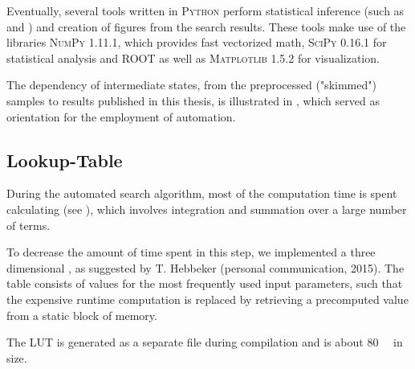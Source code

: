 Eventually, several tools written in \textsc{Python} perform statistical inference (such as \ptilde and \phat) and creation of figures from the search results. These tools make use of the libraries \textsc{NumPy} 1.11.1\cite{Walt:NumPyarraystructure}, which provides fast vectorized math, \textsc{SciPy} 0.16.1\cite{Jones:SciPyOpensource} for statistical analysis and \textsc{ROOT} as well as \textsc{Matplotlib} 1.5.2\cite{Hunter:Matplotlib2Dgraphics} for visualization.

The dependency of intermediate states, from the preprocessed ("skimmed") samples to results published in this thesis, is illustrated in , which served as orientation for the employment of automation.

\subsection{Lookup-Table}
During the automated search algorithm, most of the computation time is spent calculating \TS (see ), which involves integration and summation over a large number of terms.

To decrease the amount of time spent in this step, we implemented a three dimensional , as suggested by T. Hebbeker (personal communication, 2015). The table consists of \TS values for the most frequently used input parameters, such that the expensive runtime computation is replaced by retrieving a precomputed value from a static block of memory.

The \ac{LUT} is generated as a separate file during compilation and is about \SI{80}{\mega\byte} in size.

